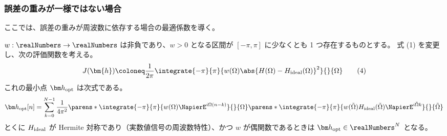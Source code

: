         \subsubsection{誤差の重みが一様ではない場合}
            ここでは、誤差の重みが周波数に依存する場合の最適係数を導く。
            \begin{shadebox}
                $w:\realNumbers\to\realNumbers$ は非負であり、$w>0$ となる区間が $[-\pi,\pi]$ に少なくとも 1 つ存在するものとする。
                式 (1) を変更し、次の評価関数を考える。
                \[ J(\bm{h}) \coloneq \frac{1}{2\pi}\integrate{-\pi}{\pi}{w(\Omega)\abs{H(\Omega)-\Hideal(\Omega)}^2}{}{\Omega}\tag{4} \]
                これの最小点 $\vhOpt$ は次式である。
                \[ \vhOpt[n] = \sum_{k=0}^{N-1}\frac{1}{4\pi^2}\parens*{\integrate{-\pi}{\pi}{w(\Omega)\NapierE^{i\Omega(n-k)}}{}{\Omega}}\parens*{\integrate{-\pi}{\pi}{w(\tilde{\Omega})\Hideal(\tilde{\Omega})\NapierE^{i\tilde{\Omega}k}}{}{\tilde{\Omega}}} \]
                とくに $H_\text{ideal}$ が Hermite 対称であり（実数値信号の周波数特性）、かつ $w$ が偶関数であるときは $\vhOpt\in\realNumbers^N$ となる。
            \end{shadebox}
